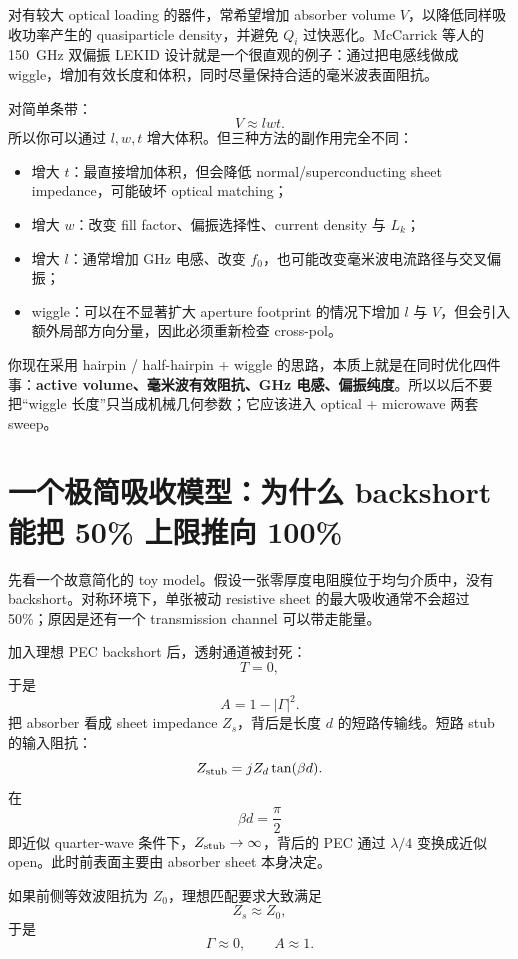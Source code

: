\documentclass[11pt,a4paper,openany]{ctexrep}
\begin{document}
对有较大 optical loading 的器件，常希望增加 absorber volume $V$，以降低同样吸收功率产生的 quasiparticle density，并避免 $Q_i$ 过快恶化。McCarrick 等人的 \SI{150}{GHz} 双偏振 LEKID 设计就是一个很直观的例子：通过把电感线做成 wiggle，增加有效长度和体积，同时尽量保持合适的毫米波表面阻抗。

对简单条带：
\[
V\approx lwt.
\]
所以你可以通过 $l,w,t$ 增大体积。但三种方法的副作用完全不同：
\begin{itemize}
  \item 增大 $t$：最直接增加体积，但会降低 normal/superconducting sheet impedance，可能破坏 optical matching；
  \item 增大 $w$：改变 fill factor、偏振选择性、current density 与 $L_k$；
  \item 增大 $l$：通常增加 GHz 电感、改变 $f_0$，也可能改变毫米波电流路径与交叉偏振；
  \item wiggle：可以在不显著扩大 aperture footprint 的情况下增加 $l$ 与 $V$，但会引入额外局部方向分量，因此必须重新检查 cross-pol。
\end{itemize}

\begin{projectbox}
你现在采用 hairpin / half-hairpin + wiggle 的思路，本质上就是在同时优化四件事：\textbf{active volume、毫米波有效阻抗、GHz 电感、偏振纯度}。所以以后不要把“wiggle 长度”只当成机械几何参数；它应该进入 optical + microwave 两套 sweep。
\end{projectbox}

\section{一个极简吸收模型：为什么 backshort 能把 50\% 上限推向 100\%}

先看一个故意简化的 toy model。假设一张零厚度电阻膜位于均匀介质中，没有 backshort。对称环境下，单张被动 resistive sheet 的最大吸收通常不会超过 50\%；原因是还有一个 transmission channel 可以带走能量。

加入理想 PEC backshort 后，透射通道被封死：
\[
T=0,
\]
于是
\[
A=1-|\Gamma|^2.
\]
把 absorber 看成 sheet impedance $Z_s$，背后是长度 $d$ 的短路传输线。短路 stub 的输入阻抗：
\[
Z_{\rm stub}=jZ_d\tan(\beta d).
\]
在
\[
\beta d=\frac{\pi}{2}
\]
即近似 quarter-wave 条件下，$Z_{\rm stub}\rightarrow\infty$，背后的 PEC 通过 $\lambda/4$ 变换成近似 open。此时前表面主要由 absorber sheet 本身决定。

如果前侧等效波阻抗为 $Z_0$，理想匹配要求大致满足
\[
\boxed{Z_s\approx Z_0,}
\]
于是
\[
\Gamma\approx0,\qquad A\approx1.
\]
\end{document}
